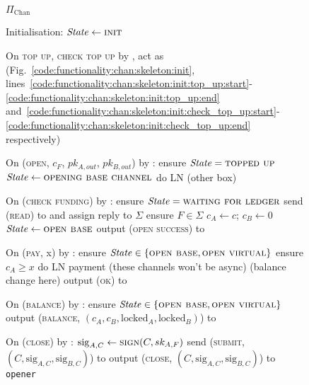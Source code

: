 \begin{figure}[H]
  \begin{protocolbox}{$\Pi_{\mathrm{Chan}}$}
    \begin{algorithmic}[1]
      \State Initialisation:
      \Indent
        \State $\mathit{State} \gets \textsc{init}$
      \EndIndent
      \Statex

      \State On \textsc{top up}, \textsc{check top up} by \environment, act as
      \fchan (Fig.~\ref{code:functionality:chan:skeleton:init},
      lines~\ref{code:functionality:chan:skeleton:init:top_up:start}-\ref{code:functionality:chan:skeleton:init:top_up:end}
      and~\ref{code:functionality:chan:skeleton:init:check_top_up:start}-\ref{code:functionality:chan:skeleton:init:check_top_up:end}
      respectively)
      \Statex

      \State On (\textsc{open}, $c_F$, $pk_{A, out}$, $pk_{B, out}$) by
      \environment:
      \Indent
        \State ensure $\mathit{State} = \textsc{topped up}$
        \State $\mathit{State} \gets \textsc{opening base channel}$
        \State do LN (other box) %
      \EndIndent
      \Statex

      \State On (\textsc{check funding}) by \environment:
      \Indent
        \State ensure $\mathit{State} = \textsc{waiting for ledger}$
        \State send (\textsc{read}) to \ledger and assign reply to $\Sigma$
        \State ensure $F \in \Sigma$
        \State $c_A \gets c$; $c_B \gets 0$ 
        \State $\mathit{State} \gets \textsc{open base}$
        \State output (\textsc{open success}) to \environment
      \EndIndent
      \Statex

      \State On (\textsc{pay}, x) by \environment:
      \Indent
        \State ensure $\mathit{State} \in \{\textsc{open base}, \textsc{open
        virtual}\}$
        \State ensure $c_A \geq x$
        \State do LN payment (these channels won't be async) (balance change
        here) %
        \State output (\textsc{ok}) to \environment
      \EndIndent
      \Statex

      \State On (\textsc{balance}) by \environment:
      \Indent
        \State ensure $\mathit{State} \in \{\textsc{open base}, \textsc{open
        virtual}\}$
        \State output (\textsc{balance}, $(c_A, c_B, \mathrm{locked}_A,
        \mathrm{locked}_B)$) to \environment %
      \EndIndent
      \Statex

      \State On (\textsc{close}) by \environment:
      \Indent
          \State $\mathrm{sig}_{A, C} \gets \textsc{sign}(C, sk_{A, F})$
          \State send (\textsc{submit}, $(C, \mathrm{sig}_{A, C},
          \mathrm{sig}_{B, C})$) to \ledger
          \State output (\textsc{close}, $(C, \mathrm{sig}_{A, C},
          \mathrm{sig}_{B, C})$) to \texttt{opener}
        \EndIf
      \EndIndent
    \end{algorithmic}
  \end{protocolbox}
  \caption{}
  \label{code:protocol:chan:skeleton}
\end{figure}

